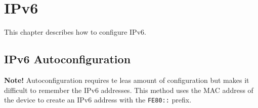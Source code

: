 \section{IPv6}
This chapter describes how to configure IPv6.
\subsection{IPv6 Autoconfiguration}
\begin{tcolorbox}
\textbf{Note!} Autoconfiguration requires te leas amount of configuration but makes it difficult to remember the IPv6 addresses.
This method uses the MAC address of the device to create an IPv6 address with the \verb!FE80::! prefix.
\end{tcolorbox}

